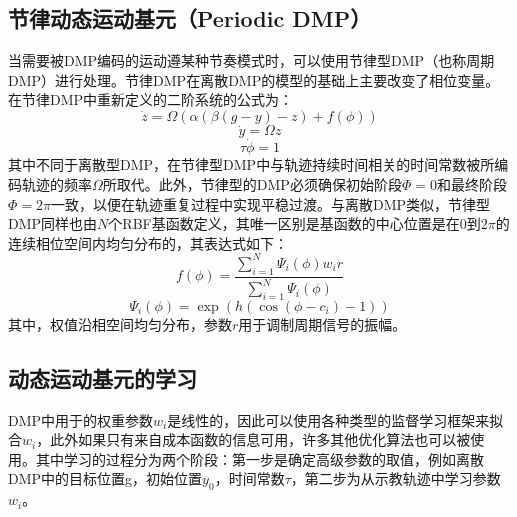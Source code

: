 \subsection{节律动态运动基元（Periodic DMP）}
当需要被DMP编码的运动遵某种节奏模式时，可以使用节律型DMP（也称周期DMP）进行处理。节律DMP在离散DMP的模型的基础上主要改变了相位变量。在节律DMP中重新定义的二阶系统的公式为：
\begin{equation}
    \dot{z}=\Omega(\alpha(\beta(g-y)-z)+f(\phi))
    \label{eq:2-8}
\end{equation}
\begin{equation}
    \dot{y}=\Omega z
    \label{eq:2-9}
\end{equation}
\begin{equation}
    \tau \dot{\phi}=1
    \label{eq:2-10}
\end{equation}
其中不同于离散型DMP，在节律型DMP中与轨迹持续时间相关的时间常数被所编码轨迹的频率$\Omega$所取代。此外，节律型的DMP必须确保初始阶段$\Phi = 0$和最终阶段$\Phi = 2\pi$一致，以便在轨迹重复过程中实现平稳过渡。与离散DMP类似，节律型DMP同样也由$N$个RBF基函数定义，其唯一区别是基函数的中心位置是在0到$2\pi$的连续相位空间内均匀分布的，其表达式如下：
\begin{equation}
    f(\phi)=\frac{\sum_{i=1}^N \Psi_i(\phi) w_i r}{\sum_{i=1}^N \Psi_i(\phi)}
    \label{eq:2-11}
\end{equation}
\begin{equation}
    \Psi_i(\phi)=\exp \left(h\left(\cos \left(\phi-c_i\right)-1\right)\right)
    \label{eq:2-12}
\end{equation}
其中，权值沿相空间均匀分布，参数$r$用于调制周期信号的振幅。
\subsection{动态运动基元的学习}
DMP中用于的权重参数$w_i$是线性的，因此可以使用各种类型的监督学习框架来拟合$w_i$，此外如果只有来自成本函数的信息可用，许多其他优化算法也可以被使用。其中学习的过程分为两个阶段\cite{saverianoDynamicMovementPrimitives2023}：第一步是确定高级参数的取值，例如离散DMP中的目标位置g，初始位置$y_0$，时间常数$τ$，第二步为从示教轨迹中学习参数$w_i$。

